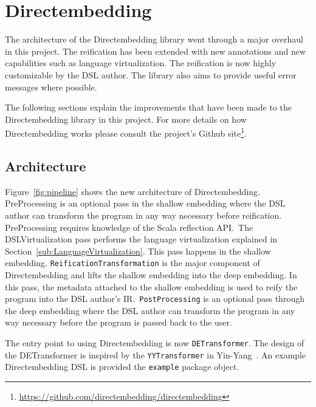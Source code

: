 \section{Directembedding} %
\label{sec:Directembedding}
The architecture of the Directembedding library went through a major overhaul in this project.
The reification has been extended with new annotations and new capabilities such as language virtualization.
The reification is now highly customizable by the DSL author.
The library also aims to provide useful error messages where possible.

The following sections explain the improvements that have been made to the Directembedding library in this project.
For more details on how Directembedding works please consult the project's Github site\footnote{\href{https://github.com/directembedding/directembedding}{https://github.com/directembedding/directembedding}}.

\subsection{Architecture} %
\label{sub:Architecture}
Figure~\ref{fig:pipeline} shows the new architecture of Directembedding.
PreProcessing is an optional pass in the shallow embedding where the DSL author can transform the program in any way necessary before reification.
PreProcessing requires knowledge of the Scala reflection API.\
The DSLVirtualization pass performs the language virtualization explained in Section~\ref{sub:LanguageVirtualization}.
This pass happens in the shallow embedding.
\texttt{ReificationTransformation} is the major component of Directembedding and lifts the shallow embedding into the deep embedding.
In this pass, the metadata attached to the shallow embedding is used to reify the program into the DSL author's IR.\
\texttt{PostProcessing} is an optional pass through the deep embedding where the DSL author can transform the program in any way necessary before the program is passed back to the user.


The entry point to using Directembedding is now \texttt{DETransformer}.
The design of the DETransformer is inspired by the \texttt{YYTransformer} in Yin-Yang~\autocite{jovanovic_yin-yang:_2014}.
An example Directembedding DSL is provided the \texttt{example} package object.

